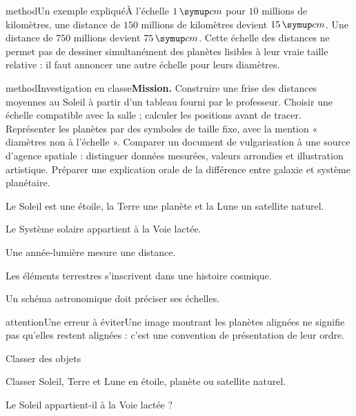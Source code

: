 \begin{pcEncadre}{method}{Un exemple expliqué}À l’échelle $1\unite{cm}$ pour $10$ millions de kilomètres, une distance de $150$ millions de kilomètres devient $15\unite{cm}$. Une distance de $750$ millions devient $75\unite{cm}$. Cette échelle des distances ne permet pas de dessiner simultanément des planètes lisibles à leur vraie taille relative : il faut annoncer une autre échelle pour leurs diamètres.\end{pcEncadre}
\label{activite-8}
\begin{pcEncadre}{method}{Investigation en classe}\textbf{Mission.} Construire une frise des distances moyennes au Soleil à partir d’un tableau fourni par le professeur. Choisir une échelle compatible avec la salle ; calculer les positions avant de tracer. Représenter les planètes par des symboles de taille fixe, avec la mention « diamètres non à l’échelle ». Comparer un document de vulgarisation à une source d’agence spatiale : distinguer données mesurées, valeurs arrondies et illustration artistique. Préparer une explication orale de la différence entre galaxie et système planétaire.\end{pcEncadre}
\begin{questions}
\item Le Soleil est une étoile, la Terre une planète et la Lune un satellite naturel.
\item Le Système solaire appartient à la Voie lactée.
\item Une année-lumière mesure une distance.
\item Les éléments terrestres s’inscrivent dans une histoire cosmique.
\item Un schéma astronomique doit préciser ses échelles.
\end{questions}
\begin{pcEncadre}{attention}{Une erreur à éviter}Une image montrant les planètes alignées ne signifie pas qu’elles restent alignées : c’est une convention de présentation de leur ordre.\end{pcEncadre}
\pcGrille
\clearpage{}
\par\noindent\begin{minipage}{\linewidth}
\begin{exercice}[1]{Classer des objets}
\begin{questions}
\item Classer Soleil, Terre et Lune en étoile, planète ou satellite naturel.
\item Le Soleil appartient-il à la Voie lactée ?
\end{questions}
\end{exercice}
\end{minipage}
